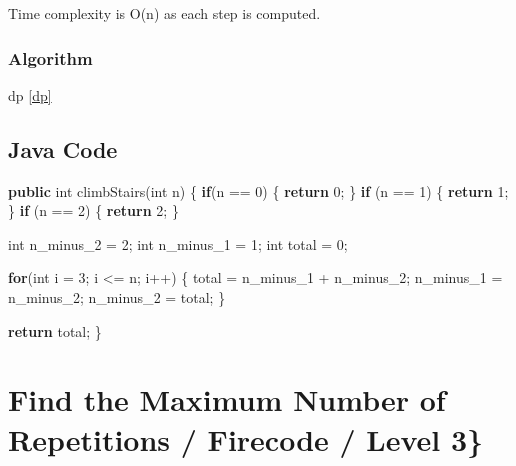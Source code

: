 \documentclass[]{book}
\newenvironment{Shaded}{\begin{snugshade}}{\end{snugshade}}
\newcommand{\DataTypeTok}[1]{\textcolor[rgb]{0.13,0.29,0.53}{#1}}
\newcommand{\DecValTok}[1]{\textcolor[rgb]{0.00,0.00,0.81}{#1}}
\newcommand{\FunctionTok}[1]{\textcolor[rgb]{0.00,0.00,0.00}{#1}}
\newcommand{\KeywordTok}[1]{\textcolor[rgb]{0.13,0.29,0.53}{\textbf{#1}}}
\newcommand{\NormalTok}[1]{#1}
\begin{document}
Time complexity is O(n) as each step is computed.

\hypertarget{algorithm-33}{%
\subsubsection{Algorithm}\label{algorithm-33}}

dp \ref{dp}

\hypertarget{java-code-27}{%
\subsection{Java Code}\label{java-code-27}}

\begin{Shaded}
\begin{Highlighting}[]
\KeywordTok{public} \DataTypeTok{int} \FunctionTok{climbStairs}\NormalTok{(}\DataTypeTok{int}\NormalTok{ n) \{}
    \KeywordTok{if}\NormalTok{(n == }\DecValTok{0}\NormalTok{) \{}
        \KeywordTok{return} \DecValTok{0}\NormalTok{;}
\NormalTok{    \}}
    \KeywordTok{if}\NormalTok{ (n == }\DecValTok{1}\NormalTok{) \{}
        \KeywordTok{return} \DecValTok{1}\NormalTok{;}
\NormalTok{    \}}
    \KeywordTok{if}\NormalTok{ (n == }\DecValTok{2}\NormalTok{) \{}
        \KeywordTok{return} \DecValTok{2}\NormalTok{;}
\NormalTok{    \}}

    \DataTypeTok{int}\NormalTok{ n_minus_}\DecValTok{2}\NormalTok{ = }\DecValTok{2}\NormalTok{;}
    \DataTypeTok{int}\NormalTok{ n_minus_}\DecValTok{1}\NormalTok{ = }\DecValTok{1}\NormalTok{;}
    \DataTypeTok{int}\NormalTok{ total = }\DecValTok{0}\NormalTok{;}

    \KeywordTok{for}\NormalTok{(}\DataTypeTok{int}\NormalTok{ i = }\DecValTok{3}\NormalTok{; i <= n; i++) \{}
\NormalTok{        total = n_minus_}\DecValTok{1}\NormalTok{ + n_minus_}\DecValTok{2}\NormalTok{;}
\NormalTok{        n_minus_}\DecValTok{1}\NormalTok{ = n_minus_}\DecValTok{2}\NormalTok{;}
\NormalTok{        n_minus_}\DecValTok{2}\NormalTok{ = total;}
\NormalTok{    \}}

    \KeywordTok{return}\NormalTok{ total;}
\NormalTok{\}}
\end{Highlighting}
\end{Shaded}

\hypertarget{find-the-maximum-number-of-repetitions-firecode-level-3}{%
\section{Find the Maximum Number of Repetitions / Firecode / Level 3\}}\label{find-the-maximum-number-of-repetitions-firecode-level-3}}
\end{document}
